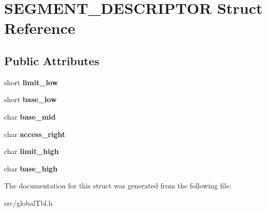 \hypertarget{struct_s_e_g_m_e_n_t___d_e_s_c_r_i_p_t_o_r}{}\section{S\+E\+G\+M\+E\+N\+T\+\_\+\+D\+E\+S\+C\+R\+I\+P\+T\+O\+R Struct Reference}
\label{struct_s_e_g_m_e_n_t___d_e_s_c_r_i_p_t_o_r}
\subsection*{Public Attributes}
\begin{DoxyCompactItemize}
\item 
\hypertarget{struct_s_e_g_m_e_n_t___d_e_s_c_r_i_p_t_o_r_a0803305ab8379f00d89e0602dedb917e}{}short {\bfseries limit\+\_\+low}\label{struct_s_e_g_m_e_n_t___d_e_s_c_r_i_p_t_o_r_a0803305ab8379f00d89e0602dedb917e}

\item 
\hypertarget{struct_s_e_g_m_e_n_t___d_e_s_c_r_i_p_t_o_r_a9a1363950b70add431f23e0912b870ac}{}short {\bfseries base\+\_\+low}\label{struct_s_e_g_m_e_n_t___d_e_s_c_r_i_p_t_o_r_a9a1363950b70add431f23e0912b870ac}

\item 
\hypertarget{struct_s_e_g_m_e_n_t___d_e_s_c_r_i_p_t_o_r_afd16b791263e4febacb1ca638ef0b0c9}{}char {\bfseries base\+\_\+mid}\label{struct_s_e_g_m_e_n_t___d_e_s_c_r_i_p_t_o_r_afd16b791263e4febacb1ca638ef0b0c9}

\item 
\hypertarget{struct_s_e_g_m_e_n_t___d_e_s_c_r_i_p_t_o_r_a5ccda605946b1f4e39d4833ff9069637}{}char {\bfseries access\+\_\+right}\label{struct_s_e_g_m_e_n_t___d_e_s_c_r_i_p_t_o_r_a5ccda605946b1f4e39d4833ff9069637}

\item 
\hypertarget{struct_s_e_g_m_e_n_t___d_e_s_c_r_i_p_t_o_r_a6d67cf52ff8b3008c61d88780944cee4}{}char {\bfseries limit\+\_\+high}\label{struct_s_e_g_m_e_n_t___d_e_s_c_r_i_p_t_o_r_a6d67cf52ff8b3008c61d88780944cee4}

\item 
\hypertarget{struct_s_e_g_m_e_n_t___d_e_s_c_r_i_p_t_o_r_a4b0982b6c7c0b841ab269f871873d128}{}char {\bfseries base\+\_\+high}\label{struct_s_e_g_m_e_n_t___d_e_s_c_r_i_p_t_o_r_a4b0982b6c7c0b841ab269f871873d128}

\end{DoxyCompactItemize}


The documentation for this struct was generated from the following file\+:\begin{DoxyCompactItemize}
\item 
src/global\+Tbl.\+h\end{DoxyCompactItemize}
